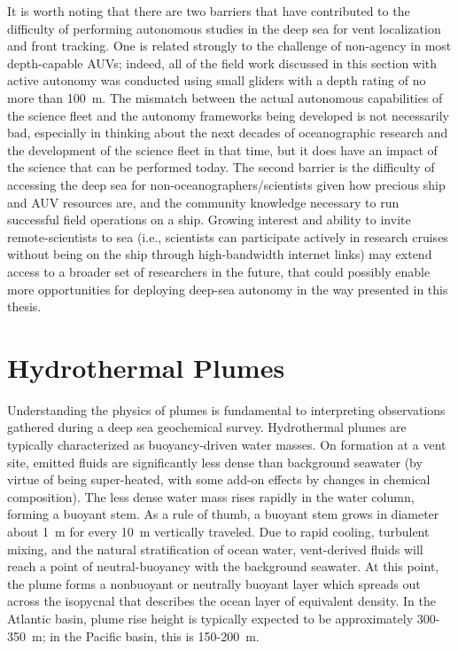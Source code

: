 It is worth noting that there are two barriers that have contributed to the difficulty of performing autonomous studies in the deep sea for vent localization and front tracking. One is related strongly to the challenge of non-agency in most depth-capable AUVs; indeed, all of the field work discussed in this section with active autonomy was conducted using small gliders with a depth rating of no more than \SI{100}{\meter}. The mismatch between the actual autonomous capabilities of the science fleet and the autonomy frameworks being developed is not necessarily bad, especially in thinking about the next decades of oceanographic research and the development of the science fleet in that time, but it does have an impact of the science that can be performed today. The second barrier is the difficulty of accessing the deep sea for non-oceanographers/scientists given how precious ship and AUV resources are, and the community knowledge necessary to run successful field operations on a ship. Growing interest and ability to invite remote-scientists to sea (i.e., scientists can participate actively in research cruises without being on the ship through high-bandwidth internet links) may extend access to a broader set of researchers in the future, that could possibly enable more opportunities for deploying deep-sea autonomy in the way presented in this thesis.  


\section{Hydrothermal Plumes}
Understanding the physics of plumes is fundamental to interpreting observations gathered during a deep sea geochemical survey. Hydrothermal plumes are typically characterized as buoyancy-driven water masses. On formation at a vent site, emitted fluids are significantly less dense than background seawater (by virtue of being super-heated, with some add-on effects by changes in chemical composition). The less dense water mass rises rapidly in the water column, forming a buoyant stem. As a rule of thumb, a buoyant stem grows in diameter about \SI{1}{\meter} for every \SI{10}{\meter} vertically traveled. Due to rapid cooling, turbulent mixing, and the natural stratification of ocean water, vent-derived fluids will reach a point of neutral-buoyancy with the background seawater. At this point, the plume forms a nonbuoyant or neutrally buoyant layer which spreads out across the isopycnal that describes the ocean layer of equivalent density. In the Atlantic basin, plume rise height is typically expected to be approximately 300-\SI{350}{\meter}; in the Pacific basin, this is 150-\SI{200}{\meter}\autocite{speer1989model}. 

